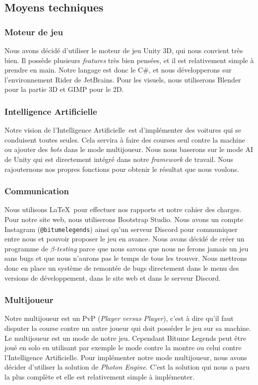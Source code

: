 \documentclass[12pt,a4paper]{article}
\newcommand{\AI}{Intelligence Artificielle}
\begin{document}
  \subsection{Moyens techniques}
    \subsubsection{Moteur de jeu}
      Nous avons décidé d'utiliser le moteur de jeu Unity 3D, qui nous convient très bien. Il possède plusieurs 
      \textit{features} très bien pensées, et il est relativement simple à prendre en main. Notre langage est 
      donc le C\#, et nous développerons sur l'environnement Rider de JetBrains. Pour les visuels, nous
      utiliserons Blender pour la partie 3D et GIMP pour le 2D.
    \subsubsection{\AI}
      Notre vision de l'\AI\, est d'implémenter des voitures qui se conduisent toutes seules.
      Cela servira à faire des courses seul contre la machine ou ajouter des \textit{bots} dans le mode 
      multijoueur. Nous nous baserons sur le mode AI de Unity qui est directement intégré
      dans notre \textit{framework} de travail. Nous rajouternons nos propres fonctions pour obtenir
      le résultat que nous voulons.
    \subsubsection{Communication}
      Nous utilisons \LaTeX\, pour effectuer nos rapports et notre cahier des charges. Pour notre site web, 
      nous utiliserons Bootstrap Studio. Nous avons un compte Instagram (\texttt{@bitumelegends}) 
      ainsi qu'un serveur Discord pour communiquer entre nous et pouvoir proposer le jeu en avance.
      Nous avons décidé de créer un programme de \(\beta\)\textit{-testing} parce que nous savons que nous 
      ne ferons jamais un jeu sans bugs et que nous n'aurons pas le temps de tous les trouver. Nous mettrons
      donc en place un système de remontée de bugs directement dans le menu des versions de développement, 
      dans le site web et dans le serveur Discord.
    \subsubsection{Multijoueur}
      Notre multijoueur est un PvP (\textit{Player versus Player}), c'est à dire qu'il faut disputer la course 
      contre un autre joueur qui doit posséder le jeu sur sa machine. Le multijoueur est un mode de notre jeu. 
      Cependant Bitume Legends peut être joué en solo en utilisant par exemple le mode contre la montre ou 
      celui contre l'Intelligence Artificielle. Pour implémenter notre mode multijoueur, nous avons décider 
      d'utiliser la solution de \emph{Photon Engine}. C'est la solution qui nous a paru la plus complète et 
      elle est relativement simple à implémenter.
\end{document}
